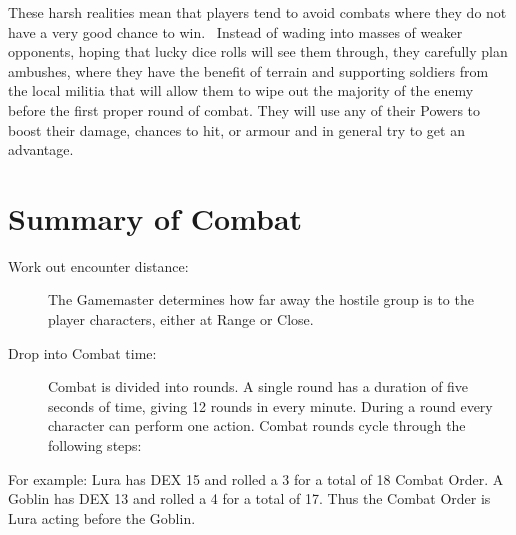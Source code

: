 These harsh realities mean that players tend to avoid combats where they do not have a very good chance to win.  Instead of wading into masses of weaker opponents, hoping that lucky dice rolls will see them through, they carefully plan ambushes, where they have the benefit of terrain and supporting soldiers from the local militia that will allow them to wipe out the majority of the enemy before the first proper round of combat. They will use any of their Powers to boost their damage, chances to hit, or armour and in general try to get an advantage.


\section{Summary of Combat}
\begin{description}
	\item[Work out encounter distance:] The Gamemaster determines how far away the hostile group is to the player characters, either at Range or Close.

	\item[Drop into Combat time:] Combat is divided into rounds. A single round has a duration of five seconds of time, giving 12 rounds in every minute. During a round every character can perform one action. Combat rounds cycle through the following steps:
\end{description}

\begin{rpg-examplebox}
For example: Lura has DEX 15 and rolled a 3 for a total of 18 Combat Order. A Goblin has DEX 13 and rolled a 4 for a total of 17. Thus the Combat Order is Lura acting before the Goblin.
\end{rpg-examplebox}


